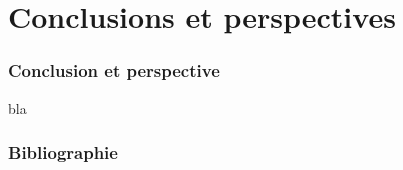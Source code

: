 \documentclass{beamer}
\begin{document}
\section{Conclusions et perspectives}

\begin{frame}
  \frametitle{Conclusion et perspective}

  bla
\end{frame}

\begin{frame}
  \titlepage
\end{frame}

\appendix

\begin{frame}[allowframebreaks]
  \frametitle{Bibliographie}
  
  
\end{frame}
\end{document}
